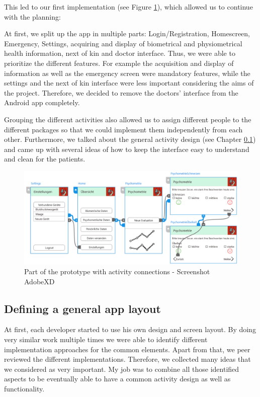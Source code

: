 This led to our first implementation (see Figure \ref{fig:xd}), which allowed us to continue with the planning:

 At first, we split up the app in multiple parts: Login/Registration, Homescreen, Emergency, Settings, acquiring and display of biometrical and physiometrical health information, next of kin and doctor interface. Thus, we were able to prioritize the different features. For example the acquisition and display of information as well as the emergency screen were mandatory features, while the settings and the next of kin interface were less important considering the aims of the project. Therefore, we decided to remove the doctors' interface from the Android app completely.
 
Grouping the different activities also allowed us to assign different people to the different packages so that we could implement them independently from each other.
Furthermore, we talked about the general activity design (see Chapter \ref{chap:baseactivity}) and came up with several ideas of how to keep the interface easy to understand and clean for the patients.

\begin{figure}[]
\vspace{-10pt}
    \centering
    \includegraphics[width=\textwidth]{figures/KlausXD.png}
    \caption{Part of the prototype with activity connections - Screenshot AdobeXD}
    \label{fig:xd}
\end{figure}

\subsection{Defining a general app layout}
\label{chap:baseactivity}
At first, each developer started to use his own design and screen layout. By doing very similar work multiple times we were able to identify different implementation approaches for the common elements. Apart from that, we peer reviewed the different implementations. Therefore, we collected many ideas that we considered as very important.
My job was to combine all those identified aspects to be eventually able to have a common activity design as well as functionality.

